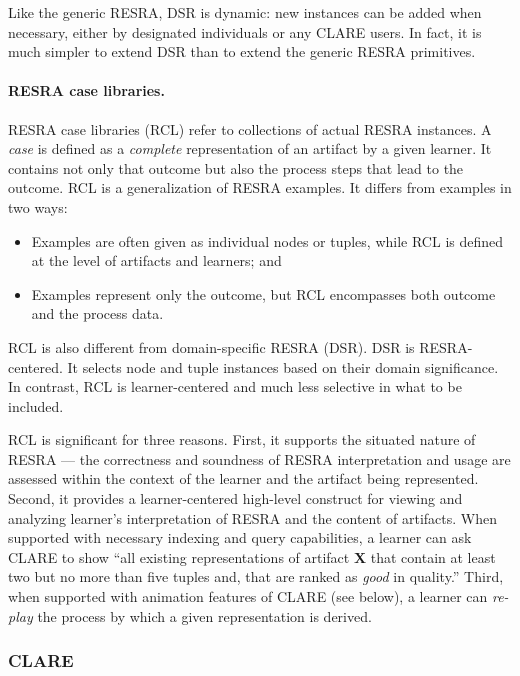 Like the generic RESRA, DSR is dynamic: new instances can be added when
necessary, either by designated individuals or any CLARE users.  In fact,
it is much simpler to extend DSR than to extend the generic RESRA
primitives.


\paragraph{RESRA case libraries.}

RESRA case libraries (RCL) refer to collections of actual RESRA instances.
A {\it case\/} is defined as a {\it complete\/} representation of an
artifact by a given learner. It contains not only that outcome but also the
process steps that lead to the outcome. RCL is a generalization of RESRA
examples. It differs from examples in two ways:

\begin{itemize}
\item Examples are often given as individual nodes or tuples, while RCL is
  defined at the level of artifacts and learners; and
  
\item Examples represent only the outcome, but RCL encompasses both
  outcome and the process data.
\end{itemize}

RCL is also different from domain-specific RESRA (DSR). DSR is
RESRA-centered. It selects node and tuple instances based on their domain
significance. In contrast, RCL is learner-centered and much less selective
in what to be included.

RCL is significant for three reasons. First, it supports the situated
nature of RESRA --- the correctness and soundness of RESRA interpretation
and usage are assessed within the context of the learner and the artifact
being represented. Second, it provides a learner-centered high-level
construct for viewing and analyzing learner's interpretation of RESRA and
the content of artifacts.  When supported with necessary indexing and query
capabilities, a learner can ask CLARE to show ``all existing
representations of artifact {\bf X\/} that contain at least two but no more
than five tuples and, that are ranked as {\it good\/} in quality.'' Third,
when supported with animation features of CLARE (see below), a learner can
{\it re-play \/} the process by which a given representation is derived.


\subsubsection{CLARE}

